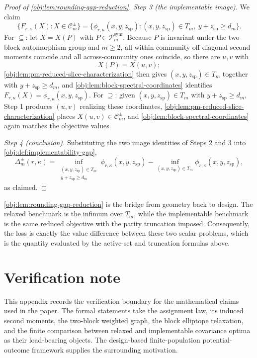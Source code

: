 \documentclass[11pt]{article}
\begin{document}
\begin{proof}[Proof of \cref{obj:lem:rounding-gap-reduction}]
\emph{Step 3 (the implementable image).}  We claim
\[
\bigl\{F_{r,\kappa}(X):X\in\mathcal C_m^{\pm}\bigr\}
=\bigl\{\phi_{r,\kappa}(x,y,z_{\mathrm{sp}}):(x,y,z_{\mathrm{sp}})\in T_m,\ y+z_{\mathrm{sp}}\ge d_m\bigr\}.
\]
For \(\subseteq\): let \(X=X(P)\) with \(P\in\mathcal P_m^{\mathrm{sym}}\).  Because \(P\) is invariant under the two-block automorphism group and \(m\ge2\), all within-community off-diagonal second moments coincide and all across-community ones coincide, so there are \(u,v\) with
\[
X(P)=X(u,v);
\]
\cref{obj:lem:pm-reduced-slice-characterization} then gives \((x,y,z_{\mathrm{sp}})\in T_m\) together with \(y+z_{\mathrm{sp}}\ge d_m\), and \cref{obj:lem:block-spectral-coordinates} identifies \(F_{r,\kappa}(X)=\phi_{r,\kappa}(x,y,z_{\mathrm{sp}})\).  For \(\supseteq\): given \((x,y,z_{\mathrm{sp}})\in T_m\) with \(y+z_{\mathrm{sp}}\ge d_m\), Step 1 produces \((u,v)\) realizing these coordinates, \cref{obj:lem:pm-reduced-slice-characterization} places \(X(u,v)\in\mathcal C_m^{\pm}\), and \cref{obj:lem:block-spectral-coordinates} again matches the objective values. %

\emph{Step 4 (conclusion).}  Substituting the two image identities of Steps 2 and 3 into \cref{obj:def:implementability-gap},
\[
\Delta_m^{\pm}(r,\kappa)
=
\inf_{\substack{(x,y,z_{\mathrm{sp}})\in T_m\\ y+z_{\mathrm{sp}}\ge d_m}}
\phi_{r,\kappa}(x,y,z_{\mathrm{sp}})
-
\inf_{(x,y,z_{\mathrm{sp}})\in T_m}
\phi_{r,\kappa}(x,y,z_{\mathrm{sp}}),
\]
as claimed. %
\end{proof}

\cref{obj:lem:rounding-gap-reduction} is the bridge from geometry back to design. The relaxed benchmark is the infimum over \(T_m\), while the implementable benchmark is the same reduced objective with the parity truncation imposed. Consequently, the loss is exactly the value difference between these two scalar problems, which is the quantity evaluated by the active-set and truncation formulas above.


\section{Verification note}

This appendix records the verification boundary for the mathematical claims used in the paper. The formal statements take the assignment law, its induced second moments, the two-block weighted graph, the block elliptope relaxation, and the finite comparison between relaxed and implementable covariance optima as their load-bearing objects. The design-based finite-population potential-outcome framework supplies the surrounding motivation.
\end{document}
